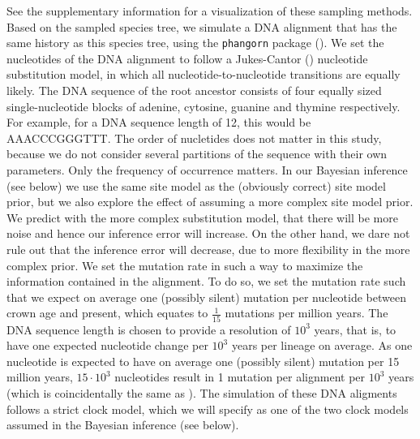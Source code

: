 \documentclass{article}
\begin{document}
See the supplementary information for a visualization of these sampling methods.
Based on the sampled species tree, we simulate a DNA alignment that has the same history
as this species tree, using the \verb;phangorn; package (\cite{phangorn}). 
We set the nucleotides of the DNA alignment to follow a Jukes-Cantor (\cite{jc69})
nucleotide substitution model, in which all nucleotide-to-nucleotide transitions
are equally likely. 
The DNA sequence of the root ancestor consists of four equally sized single-nucleotide blocks of adenine, cytosine, guanine and thymine respectively. 
For example, for a DNA sequence length of 12, this would be AAACCCGGGTTT. 
The order of nucletides does not matter in this study, 
because we do not consider several partitions of the sequence with their own parameters. 
Only the frequency of occurrence matters.
In our Bayesian inference (see below) we use the same site model as the (obviously correct) site model prior,
but we also explore the effect of assuming a more complex site model prior.
We predict with the more complex substitution model, 
that there will be more noise and hence our inference error will increase.
On the other hand, we dare not rule out that the inference error will decrease,
due to more flexibility in the more complex prior.
We set the mutation rate in such a way to maximize the information contained in the alignment.
To do so, we set the mutation rate such that we expect on average one (possibly silent) mutation per nucleotide
between crown age and present, which equates to $\frac{1}{15}$ mutations
per million years.
The DNA sequence length is chosen to provide a
resolution of $10^3$ years, 
that is, to have one expected nucleotide change 
per $10^3$ years per lineage on average. As one nucleotide is expected 
to have on average one (possibly silent) mutation per 15 million years, $15 \cdot 10^3$
nucleotides result in 1 mutation per alignment per $10^3$ years (which is
coincidentally the same as \cite{moller2018}). 
The simulation of these DNA aligments follows a strict clock model, 
which we will specify as one of the two clock models assumed in the Bayesian inference (see below).
\end{document}

